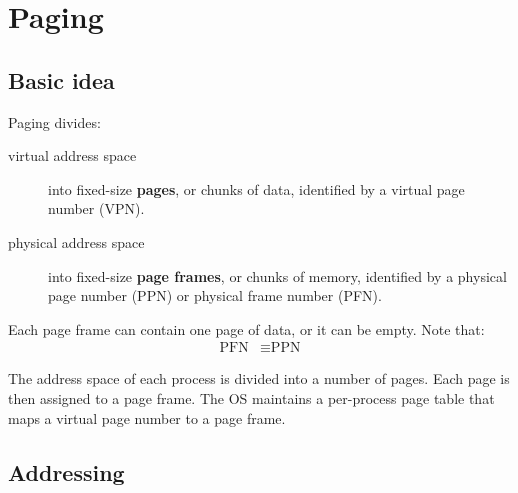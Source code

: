 \chapter{Paging}
\label{ch:paging}



\section{Basic idea}

Paging divides:
\begin{description}
\item[virtual address space] into fixed-size \textbf{pages}, or chunks of data, identified by a virtual page number (VPN).
\item[physical address space] into fixed-size \textbf{page frames}, or chunks of memory, identified by a physical page number (PPN) or physical frame number (PFN).
\end{description}
Each page frame can contain one page of data, or it can be empty.
Note that:
\begin{align}
  \mbox{PFN} & \equiv \mbox{PPN}
\end{align}

The address space of each process is divided into a number of pages.
Each page is then assigned to a page frame.
The OS maintains a per-process page table that maps a virtual page number to a page frame.

\section{Addressing}

